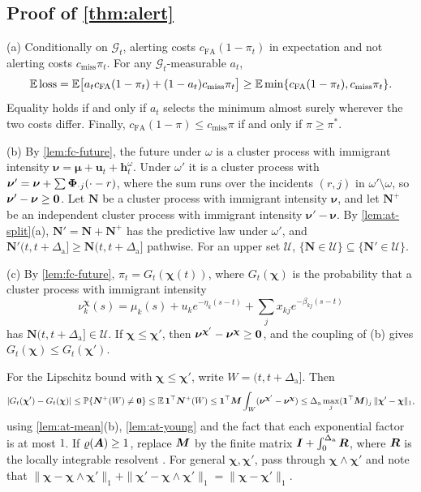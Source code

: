 \subsection{Proof of \texorpdfstring{\cref{thm:alert}}{the alerting theorem}}\label{app:fc-alert}

(a) Conditionally on $\mathcal G_t$, alerting costs $c_{\mathrm{FA}}(1-\pi_t)$ in
expectation and not alerting costs $c_{\mathrm{miss}}\pi_t$. For any
$\mathcal G_t$-measurable $a_t$,
\[
\mathbb{E}\,\mathrm{loss}=\mathbb{E}\bigl[a_tc_{\mathrm{FA}}(1-\pi_t)+(1-a_t)c_{\mathrm{miss}}\pi_t\bigr]
\ge\mathbb{E}\min\{c_{\mathrm{FA}}(1-\pi_t),c_{\mathrm{miss}}\pi_t\}.
\]
Equality holds if and only if $a_t$ selects the minimum almost surely wherever the two
costs differ. Finally, $c_{\mathrm{FA}}(1-\pi)\le c_{\mathrm{miss}}\pi$ if and only if
$\pi\ge\pi^*$.

(b) By \cref{lem:fc-future}, the future under $\omega$ is a cluster process with
immigrant intensity $\bm\nu=\bm\mu+\bm u_t+\bm h^{\omega}_t$. Under $\omega'$ it is a
cluster process with
$\bm\nu'=\bm\nu+\sum\bm{\Phi}_{\cdot j}(\cdot-r)$, where the sum runs over the incidents
$(r,j)$ in $\omega'\setminus\omega$, so $\bm\nu'-\bm\nu\ge\mathbf{0}$. Let $\bm N$ be a cluster
process with immigrant intensity $\bm\nu$, and let $\bm N^+$ be an independent cluster
process with immigrant intensity $\bm\nu'-\bm\nu$. By \cref{lem:at-split}(a),
$\bm N'=\bm N+\bm N^+$ has the predictive law under $\omega'$, and
$\bm N'(t,t+\Delta_{\mathrm a}]\ge\bm N(t,t+\Delta_{\mathrm a}]$ pathwise. For an upper set $\mathcal U$,
$\{\bm N\in\mathcal U\}\subseteq\{\bm N'\in\mathcal U\}$.

(c) By \cref{lem:fc-future}, $\pi_t=G_t(\bm\chi(t))$, where $G_t(\bm\chi)$ is the
probability that a cluster process with immigrant intensity
\[
\nu^{\bm\chi}_k(s)=\mu_k(s)+u_ke^{-\eta_k(s-t)}+\sum_jx_{kj}e^{-\beta_{kj}(s-t)}
\]
has $\bm N(t,t+\Delta_{\mathrm a}]\in\mathcal U$. If $\bm\chi\le\bm\chi'$, then
$\bm\nu^{\bm\chi'}-\bm\nu^{\bm\chi}\ge\mathbf{0}$, and the coupling of (b) gives
$G_t(\bm\chi)\le G_t(\bm\chi')$.

For the Lipschitz bound with $\bm\chi\le\bm\chi'$, write $W=(t,t+\Delta_{\mathrm a}]$. Then
\[
|G_t(\bm\chi')-G_t(\bm\chi)|\le\mathbb{P}\{\bm N^+(W)\neq\mathbf{0}\}\le\mathbb{E}\,\mathbf 1^{\top}\bm N^+(W)
\le\mathbf 1^{\top}\bm{M}\int_W(\bm\nu^{\bm\chi'}-\bm\nu^{\bm\chi})
\le\Delta_{\mathrm a}\max_j(\mathbf 1^{\top}\bm{M})_j\,\|\bm\chi'-\bm\chi\|_1 ,
\]
using \cref{lem:at-mean}(b), \cref{lem:at-young} and the fact that each exponential
factor is at most $1$. If $\varrho(\bm{A})\ge1$, replace $\bm{M}$ by the finite matrix
$\bm{I}+\int_0^{\Delta_{\mathrm a}}\bm{R}$, where $\bm{R}$ is the locally integrable resolvent
\citep[Ch.~2]{gripenberg1990}. For general $\bm\chi,\bm\chi'$, pass through
$\bm\chi\wedge\bm\chi'$ and note that
$\|\bm\chi-\bm\chi\wedge\bm\chi'\|_1+\|\bm\chi'-\bm\chi\wedge\bm\chi'\|_1=\|\bm\chi-\bm\chi'\|_1$.


